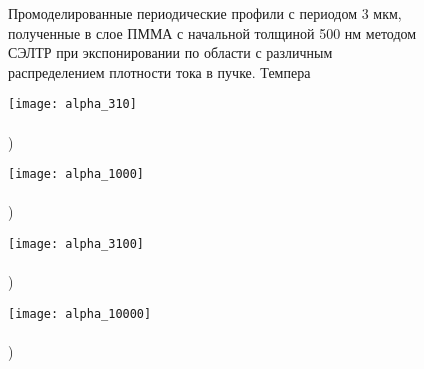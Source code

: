 \documentclass[12pt, letterpaper]{article}
\begin{document}
\begin{figure}[t!]
	\vspace{-4em}
	
	\caption{Промоделированные периодические профили с периодом 3 мкм, полученные в слое ПММА с начальной толщиной 500 нм методом СЭЛТР при экспонировании по области с различным распределением плотности тока в пучке. Темпера}
	\label{fig:DEBER_multibeam}
\end{figure}


\begin{figure}[t!]
	\begin{minipage}{0.48\textwidth}
		\texttt{[image: alpha\_310]} \\
		\vspace{-13em} \\ ) \\ \vspace{13em}
	\end{minipage}
	\begin{minipage}{0.48\textwidth}
		\texttt{[image: alpha\_1000]} \\
		\vspace{-13em} \\ ) \\ \vspace{13em}
	\end{minipage}
	
	\vspace{-3em}
	
	\begin{minipage}{0.48\textwidth}
		\texttt{[image: alpha\_3100]} \\
		\vspace{-13em} \\ ) \\ \vspace{13em}
	\end{minipage}
	\begin{minipage}{0.48\textwidth}
		\texttt{[image: alpha\_10000]} \\
		\vspace{-13em} \\ ) \\ \vspace{13em}
	\end{minipage}


\end{figure}
\end{document}
